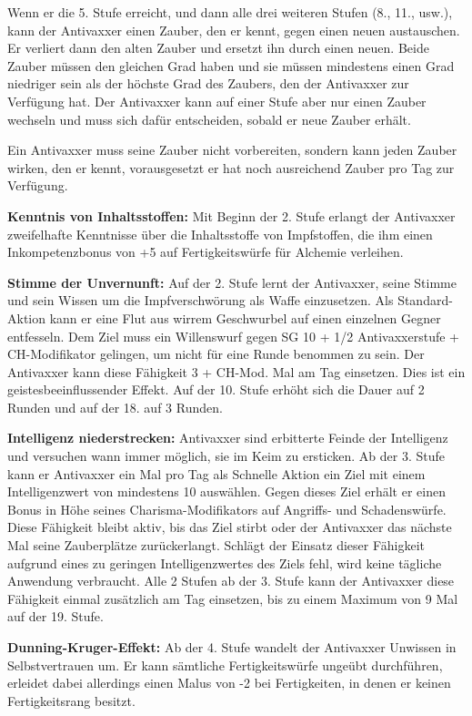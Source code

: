 \documentclass[
	ngerman,
	a4paper,
	10pt,
	twocolumn,
]{scrartcl}
\begin{document}
Wenn er die 5. Stufe erreicht, und dann alle drei weiteren Stufen (8., 11., usw.), kann der Antivaxxer einen Zauber, den er kennt, gegen einen neuen austauschen. Er verliert dann den alten Zauber und ersetzt ihn durch einen neuen. Beide Zauber müssen den gleichen Grad haben und sie müssen mindestens einen Grad niedriger sein als der höchste Grad des Zaubers, den der Antivaxxer zur Verfügung hat. Der Antivaxxer kann auf einer Stufe aber nur einen Zauber wechseln und muss sich dafür entscheiden, sobald er neue Zauber erhält.

Ein Antivaxxer muss seine Zauber nicht vorbereiten, sondern kann jeden Zauber wirken, den er kennt, vorausgesetzt er hat noch ausreichend Zauber pro Tag zur Verfügung.

\textbf{Kenntnis von Inhaltsstoffen:} Mit Beginn der 2. Stufe erlangt der Antivaxxer zweifelhafte Kenntnisse über die Inhaltsstoffe von Impfstoffen, die ihm einen Inkompetenzbonus von +5 auf Fertigkeitswürfe für Alchemie verleihen.

\textbf{Stimme der Unvernunft:} Auf der 2. Stufe lernt der Antivaxxer, seine Stimme und sein Wissen um die Impfverschwörung als Waffe einzusetzen. Als Standard-Aktion kann er eine Flut aus wirrem Geschwurbel auf einen einzelnen Gegner entfesseln. Dem Ziel muss ein Willenswurf gegen SG 10 + 1/2 Antivaxxerstufe + CH-Modifikator gelingen, um nicht für eine Runde benommen zu sein. Der Antivaxxer kann diese Fähigkeit 3 + CH-Mod. Mal am Tag einsetzen. Dies ist ein geistesbeeinflussender Effekt. Auf der 10. Stufe erhöht sich die Dauer auf 2 Runden und auf der 18. auf 3 Runden.

\textbf{Intelligenz niederstrecken:} Antivaxxer sind erbitterte Feinde der Intelligenz und versuchen wann immer möglich, sie im Keim zu ersticken. Ab der 3. Stufe kann er Antivaxxer ein Mal pro Tag als Schnelle Aktion ein Ziel mit einem Intelligenzwert von mindestens 10 auswählen. Gegen dieses Ziel erhält er einen Bonus in Höhe seines Charisma-Modifikators auf Angriffs- und Schadenswürfe. Diese Fähigkeit bleibt aktiv, bis das Ziel stirbt oder der Antivaxxer das nächste Mal seine Zauberplätze zurückerlangt. Schlägt der Einsatz dieser Fähigkeit aufgrund eines zu geringen Intelligenzwertes des Ziels fehl, wird keine tägliche Anwendung verbraucht. Alle 2 Stufen ab der 3. Stufe kann der Antivaxxer diese Fähigkeit einmal zusätzlich am Tag einsetzen, bis zu einem Maximum von 9 Mal auf der 19. Stufe.

\textbf{Dunning-Kruger-Effekt:} Ab der 4. Stufe wandelt der Antivaxxer Unwissen in Selbstvertrauen um. Er kann sämtliche Fertigkeitswürfe ungeübt durchführen, erleidet dabei allerdings einen Malus von -2 bei Fertigkeiten, in denen er keinen Fertigkeitsrang besitzt.
\end{document}
